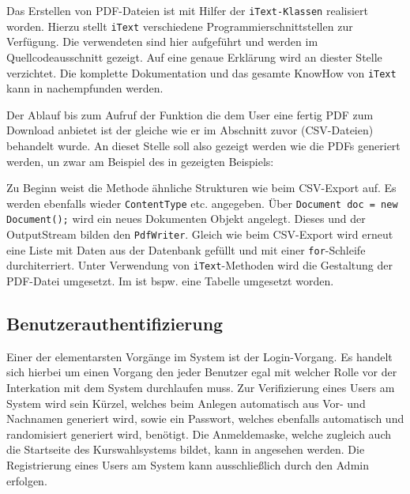 Das Erstellen von PDF-Dateien ist mit Hilfer der \texttt{iText-Klassen} realisiert worden.
Hierzu stellt \texttt{iText} verschiedene Programmierschnittstellen zur Verfügung. Die verwendeten sind hier aufgeführt und werden im Quellcodeausschnitt gezeigt. Auf eine genaue Erklärung wird an diester Stelle verzichtet. Die komplette Dokumentation und das gesamte KnowHow von \texttt{iText} kann in \cite{LowagieB-iText} nachempfunden werden.  

Der Ablauf bis zum Aufruf der Funktion die dem User eine fertig PDF zum Download anbietet ist der gleiche wie er im Abschnitt zuvor (CSV-Dateien) behandelt wurde.
An dieset Stelle soll also gezeigt werden wie die PDFs generiert werden, un zwar am Beispiel des in  gezeigten Beispiels:

		
	
Zu Beginn weist die Methode ähnliche Strukturen wie beim CSV-Export auf.
Es werden ebenfalls wieder \texttt{ContentType} etc. angegeben. Über \texttt{Document doc = new Document();} wird ein neues Dokumenten Objekt angelegt. Dieses und der OutputStream bilden den \texttt{PdfWriter}.
Gleich wie beim CSV-Export wird erneut eine Liste mit Daten aus der Datenbank gefüllt und mit einer \texttt{for}-Schleife durchiterriert.
Unter Verwendung von \texttt{iText}-Methoden wird die Gestaltung der PDF-Datei umgesetzt. Im  ist bspw. eine Tabelle umgesetzt worden.

\subsection{Benutzerauthentifizierung}

Einer der elementarsten Vorgänge im System ist der Login-Vorgang. Es handelt sich hierbei um einen Vorgang den jeder Benutzer egal mit welcher Rolle vor der Interkation mit dem System durchlaufen muss. Zur Verifizierung eines Users am System wird sein Kürzel, welches beim Anlegen automatisch aus Vor- und Nachnamen generiert wird, sowie ein Passwort, welches ebenfalls automatisch und randomisiert generiert wird, benötigt. Die Anmeldemaske, welche zugleich auch die Startseite des Kurswahlsystems bildet, kann in  angesehen werden. Die Registrierung eines Users am System kann ausschließlich durch den Admin erfolgen.

